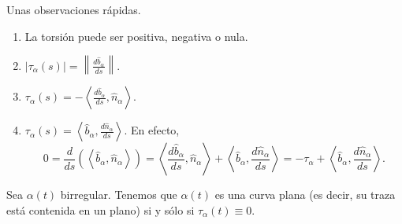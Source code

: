 \begin{observation} Unas observaciones rápidas.
\begin{enumerate}
\item La torsión puede ser positiva, negativa o nula.
\item $\displaystyle \left|\tau_{\alpha }\left(s\right)\right|=\left\|\frac{d\hat{b}_{\alpha }}{d s}\right\| $. 
\item $\displaystyle \tau_{\alpha }\left(s\right)=-\left\langle \frac{d\hat{b}_{\alpha }}{d s}, \hat{n}_{\alpha } \right\rangle  $.
\item $\displaystyle \tau_{\alpha }\left(s\right)=\left\langle \hat{b}_{\alpha }, \frac{d\hat{n}_{\alpha }}{d s} \right\rangle  $. En efecto, 
	\[0 = \frac{d}{d s}\left(\left\langle \hat{b}_{\alpha}, \hat{n}_{\alpha} \right\rangle \right)=\left\langle \frac{d\hat{b}_{\alpha }}{d s}, \hat{n}_{\alpha } \right\rangle + \left\langle \hat{b}_{\alpha }, \frac{d\hat{n}_{\alpha }}{d s} \right\rangle = -\tau_{\alpha } + \left\langle \hat{b}_{\alpha }, \frac{d \hat{n}_{\alpha} }{d s} \right\rangle  .\]
\end{enumerate}
\end{observation}
\begin{prop}
Sea $\displaystyle \alpha\left(t\right) $ birregular. Tenemos que $\displaystyle \alpha\left(t\right) $ es una curva plana (es decir, su traza está contenida en un plano) si y sólo si $\displaystyle \tau_{\alpha }\left(t\right)\equiv 0 $.
\end{prop}

